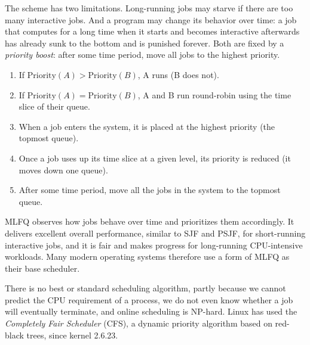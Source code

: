 The scheme has two limitations. Long-running jobs may starve if there are too many interactive jobs. And a program may change its behavior over time: a job that computes for a long time when it starts and becomes interactive afterwards has already sunk to the bottom and is punished forever. Both are fixed by a \emph{priority boost}: after some time period, move all jobs to the highest priority.

\begin{keypoint}
  \begin{enumerate}
    \item If $\text{Priority}(A) > \text{Priority}(B)$, A runs (B does not).
    \item If $\text{Priority}(A) = \text{Priority}(B)$, A and B run round-robin using the time slice of their queue.
    \item When a job enters the system, it is placed at the highest priority (the topmost queue).
    \item Once a job uses up its time slice at a given level, its priority is reduced (it moves down one queue).
    \item After some time period, move all the jobs in the system to the topmost queue.
  \end{enumerate}
\end{keypoint}

MLFQ observes how jobs behave over time and prioritizes them accordingly. It delivers excellent overall performance, similar to SJF and PSJF, for short-running interactive jobs, and it is fair and makes progress for long-running CPU-intensive workloads. Many modern operating systems therefore use a form of MLFQ as their base scheduler.

\begin{keypoint}[Summary]
  There is no best or standard scheduling algorithm, partly because we cannot predict the CPU requirement of a process, we do not even know whether a job will eventually terminate, and online scheduling is NP-hard. Linux has used the \emph{Completely Fair Scheduler} (CFS), a dynamic priority algorithm based on red-black trees, since kernel 2.6.23.
\end{keypoint}

